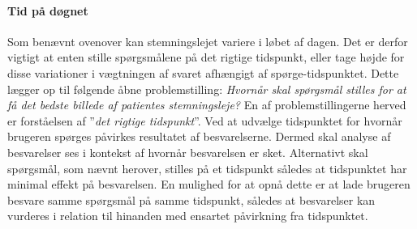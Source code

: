 \paragraph{Tid på døgnet}
Som benævnt ovenover kan stemningslejet variere i løbet af dagen.
Det er derfor vigtigt at enten stille spørgsmålene på det rigtige tidspunkt, eller tage højde for disse variationer i vægtningen af svaret afhængigt af spørge-tidspunktet.
Dette lægger op til følgende åbne problemstilling: \textit{Hvornår skal spørgsmål stilles for at få det bedste billede af patientes stemningsleje?}
En af problemstillingerne herved er forståelsen af ''\textit{det rigtige tidspunkt}''.
Ved at udvælge tidspunktet for hvornår brugeren spørges påvirkes resultatet af besvarelserne.
Dermed skal analyse af besvarelser ses i kontekst af hvornår besvarelsen er sket.
Alternativt skal spørgsmål, som nævnt herover, stilles på et tidspunkt således at tidspunktet har minimal effekt på besvarelsen.
En mulighed for at opnå dette er at lade brugeren besvare samme spørgsmål på samme tidspunkt, således at besvarelser kan vurderes i relation til hinanden med ensartet påvirkning fra tidspunktet.

